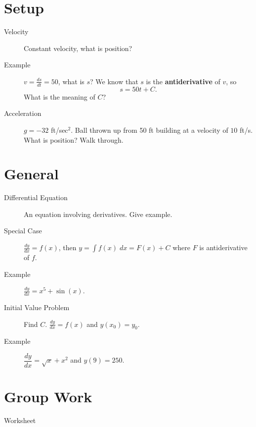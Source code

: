 \documentclass[11pt]{article}
\begin{document}
\drawtitle

\section*{Setup}
\begin{description}
\item[Velocity] Constant velocity, what is position?
\item[Example] $v=\frac{ds}{dt}=50$, what is $s$?
  We know that $s$ is the \textbf{antiderivative} of $v$, so
  \[
  s=50t+C.
  \]
  What is the meaning of $C$?
\item[Acceleration] $g=-32$ ft/sec$^2$.  Ball thrown up from 50 ft
  building at a velocity of $10$ ft/s.  What is position?  Walk through.
\end{description}

\section*{General}
\begin{description}
\item[Differential Equation] An equation involving derivatives.  Give
  example.
\item[Special Case] $\frac{dy}{dx}=f(x)$, then $y=\int
  f(x)\;dx=F(x)+C$ where $F$ is antiderivative of $f$.
\item[Example] $\frac{dy}{dx}=x^5+\sin(x)$.
\item[Initial Value Problem] Find $C$. $\frac{dy}{dx}=f(x)$ and $y(x_0)=y_0$.
\item[Example] $\dfrac{dy}{dx}=\sqrt{x}+x^2$ and $y(9)=250$.
\end{description}

\section*{Group Work}
\begin{description}
\item[Worksheet]
\end{description}
\end{document}
